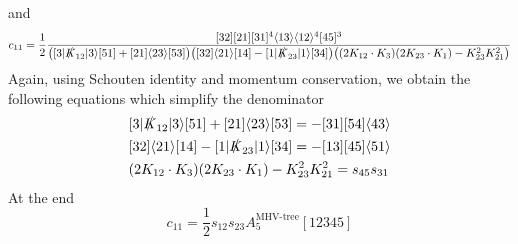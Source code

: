 and
\begin{equation*}
c_{11} = \frac{1}{2}\frac{[32][21][31]^4\langle 13\rangle\langle 12 \rangle^4 [45]^3}{\big( [3|\slashed{K}_{12}|3\rangle [51] + [21]\langle 23\rangle [53]\big)
\big( [32]\langle 21\rangle[14] - [1|\slashed{K}_{23}|1\rangle[34]\big)
\big( (2K_{12}\cdot K_3)(2K_{23}\cdot K_1) - K_{23}^2K_{21}^2\big)
}
\end{equation*}
Again, using Schouten identity and momentum conservation, we obtain the following equations which simplify the denominator
\begin{equation*}
\begin{split}
& [3|\slashed{K}_{12}|3\rangle [51] + [21]\langle 23\rangle [53] = -[31][54]\langle 43 \rangle 
\\
& [32]\langle 21\rangle[14] - [1|\slashed{K}_{23}|1\rangle[34] = -[13][45]\langle 51 \rangle
\\
&
(2K_{12}\cdot K_3)(2K_{23}\cdot K_1) - K_{23}^2K_{21}^2 = s_{45}s_{31}
\end{split}
\end{equation*}
At the end
\begin{equation*}
c_{11} = \frac{1}{2}s_{12}s_{23}A_5^{\textrm{MHV-tree}}[12345]
\end{equation*}
%
%
